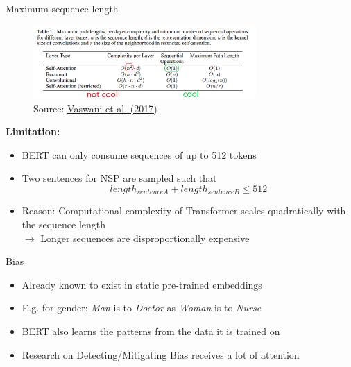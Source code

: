 \begin{frame}{Maximum sequence length}

\begin{figure}
\centering
\includegraphics[width = 8.5cm]{figure/bert-problem.png}\\ 
\footnotesize{Source:} \href{https://arxiv.org/pdf/1706.03762.pdf}{\footnotesize Vaswani et al. (2017)}
\end{figure}

\textbf{Limitation:}

\begin{itemize}
	\item BERT can only consume sequences of up to 512 tokens
	\item Two sentences for NSP are sampled such that $$length_{sentence A} + length_{sentence B} \leq 512$$
	\item Reason: Computational complexity of Transformer scales quadratically with the sequence length\\
				$\rightarrow$ Longer sequences are disproportionally expensive
\end{itemize}

\end{frame}


\begin{frame}{Bias}

\vfill

\begin{itemize}
	\item Already known to exist in static pre-trained embeddings
	\item E.g. for gender: \textit{Man} is to \textit{Doctor} as \textit{Woman} is to \textit{Nurse}
	\item BERT also learns the patterns from the data it is trained on
	\item Research on Detecting/Mitigating Bias receives a lot of attention
\end{itemize}


\vfill

\end{frame}

